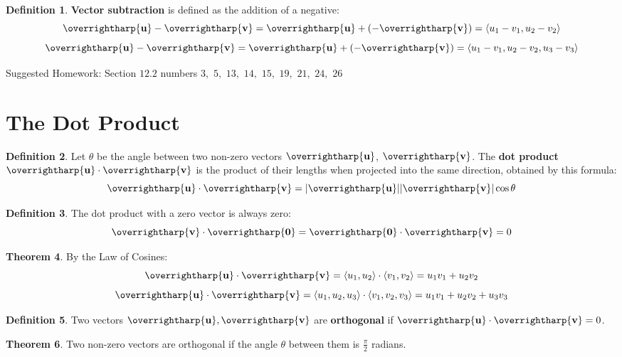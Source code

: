 \documentclass[letterpaper, twoside, 12pt]{book}
\newcommand{\<}{\langle}
\renewcommand{\>}{\rangle}
\theoremstyle{definition}
\newtheorem{theorem}{Theorem}
\theoremstyle{definition}
\newtheorem{definition}[theorem]{Definition}
\newcommand{\harpvec}[1]{\overrightharp{\ensuremath{\mathbf{#1}}}}
\begin{document}
\begin{definition}
  \textbf{Vector subtraction} is defined as the addition of a negative:
  \[
    \harpvec{u}-\harpvec{v}
      =
    \harpvec{u}+(-\harpvec{v})
      =
    \<u_1-v_1,u_2-v_2\>
  \]
  \[
    \harpvec{u}-\harpvec{v}
      =
    \harpvec{u}+(-\harpvec{v})
      =
    \<u_1-v_1,u_2-v_2,u_3-v_3\>
  \]
\end{definition}

\noindent Suggested Homework:
Section $12.2$ numbers $3,$ $5,$ $13,$ $14,$ $15,$ $19,$ $21,$ $24,$ $26$

\newpage

\section{The Dot Product}

\begin{definition}
  Let $\theta$ be the angle between two non-zero vectors $\harpvec{u}$, $\harpvec{v}$.
  The \textbf{dot product} $\harpvec{u}\cdot\harpvec{v}$ is the product of their
  lengths when projected into the same direction, obtained by this formula:
  \[
    \harpvec{u} \cdot \harpvec{v} = |\harpvec{u}||\harpvec{v}|\cos \theta
  \]
\end{definition}

\begin{definition}
  The dot product with a zero vector is always zero:
  \[\harpvec{v}\cdot\harpvec{0}=\harpvec{0}\cdot\harpvec{v}=0\]
\end{definition}

\begin{theorem}
By the Law of Cosines:
  \[
    \harpvec{u} \cdot \harpvec{v}
      =
    \<u_1,u_2\>\cdot\<v_1,v_2\>
      =
    u_1v_1 + u_2v_2
  \]
  \[
    \harpvec{u} \cdot \harpvec{v}
      =
    \<u_1,u_2,u_3\>\cdot\<v_1,v_2,v_3\>
      =
    u_1v_1 + u_2v_2 + u_3v_3
  \]
\end{theorem}

\begin{definition}
  Two vectors $\harpvec{u},\harpvec{v}$ are \textbf{orthogonal} if
  $\harpvec{u} \cdot \harpvec{v} = 0$.
\end{definition}

\begin{theorem}
  Two non-zero vectors are orthogonal if the angle $\theta$ between them
  is $\frac{\pi}{2}$ radians.
\end{theorem}
\end{document}
